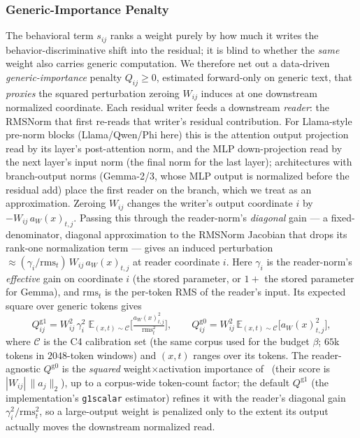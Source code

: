 \subsubsection{Generic-Importance Penalty}
\label{sec:bladeg}
The behavioral term $s_{ij}$ ranks a weight purely by how much it writes the behavior-discriminative shift into the residual; it is blind to whether the \emph{same} weight also carries generic computation. We therefore net out a data-driven \emph{generic-importance} penalty $Q_{ij}\ge 0$, estimated forward-only on generic text, that \emph{proxies} the squared perturbation zeroing $W_{ij}$ induces at one downstream normalized coordinate. Each residual writer feeds a downstream \emph{reader}: the RMSNorm that first re-reads that writer's residual contribution. For Llama-style pre-norm blocks (Llama/Qwen/Phi here) this is the attention output projection read by its layer's post-attention norm, and the MLP down-projection read by the next layer's input norm (the final norm for the last layer); architectures with branch-output norms (Gemma-2/3, whose MLP output is normalized before the residual add) place the first reader on the branch, which we treat as an approximation. Zeroing $W_{ij}$ changes the writer's output coordinate $i$ by $-W_{ij}\,a_W(x)_{t,j}$. Passing this through the reader-norm's \emph{diagonal} gain --- a fixed-denominator, diagonal approximation to the RMSNorm Jacobian that drops its rank-one normalization term --- gives an induced perturbation $\approx(\gamma_i/\mathrm{rms}_{t})\,W_{ij}\,a_W(x)_{t,j}$ at reader coordinate $i$. Here $\gamma_i$ is the reader-norm's \emph{effective} gain on coordinate $i$ (the stored parameter, or $1+$ the stored parameter for Gemma), and $\mathrm{rms}_{t}$ is the per-token RMS of the reader's input. Its expected square over generic tokens gives
\begin{equation}
  Q^{\mathrm{g1}}_{ij}=W_{ij}^2\,\gamma_i^2\;\mathbb{E}_{(x,t)\sim\mathcal{C}}\!\Big[\tfrac{a_W(x)_{t,j}^2}{\mathrm{rms}_{t}^2}\Big],
  \qquad
  Q^{\mathrm{g0}}_{ij}=W_{ij}^2\,\mathbb{E}_{(x,t)\sim\mathcal{C}}\big[a_W(x)_{t,j}^2\big],
  \label{eq:Q}
\end{equation}
where $\mathcal{C}$ is the C4 calibration set (the same corpus used for the budget $\beta$; $65$k tokens in $2048$-token windows) and $(x,t)$ ranges over its tokens. The reader-agnostic $Q^{\mathrm{g0}}$ is the \emph{squared} weight$\times$activation importance of~\cite{sun2023wanda} (their score is $|W_{ij}|\,\lVert a_j\rVert_2$), up to a corpus-wide token-count factor; the default $Q^{\mathrm{g1}}$ (the implementation's \texttt{g1scalar} estimator) refines it with the reader's diagonal gain $\gamma_i^2/\mathrm{rms}_{t}^2$, so a large-output weight is penalized only to the extent its output actually moves the downstream normalized read.

